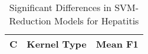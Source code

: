 \begin{table}
\centering
\caption{Significant Differences in SVM-Reduction Models for Hepatitis}
\label{tab:svm_reduction_significant_pairs_hepatitis}
\begin{tabular}{rlr}
\toprule
C & Kernel Type & Mean F1 \\
\midrule
\bottomrule
\end{tabular}
\end{table}
